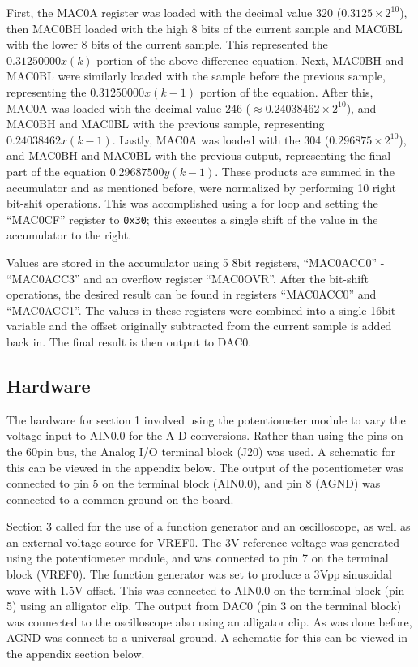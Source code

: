 \documentclass[12pt]{article}
\begin{document}
First, the MAC0A register was loaded with the decimal value 320 ($0.3125\times 2^{10}$), then MAC0BH loaded with the high 8 bits of the current sample and MAC0BL with the lower 8 bits of the current sample. This represented the $0.31250000x(k)$ portion of the above difference equation. Next, MAC0BH and MAC0BL were similarly loaded with the sample before the previous sample, representing the $0.31250000x(k-1)$ portion of the equation. After this, MAC0A was loaded with the decimal value 246 ($\approx 0.24038462\times 2^{10}$), and MAC0BH and MAC0BL with the previous sample, representing $0.24038462x(k-1)$. Lastly, MAC0A was loaded with the 304 ($0.296875\times 2^{10}$), and MAC0BH and MAC0BL with the previous output, representing the final part of the equation $0.29687500y(k-1)$. These products are summed in the accumulator and as mentioned before, were normalized by performing 10 right bit-shit operations. This was accomplished using a for loop and setting the ``MAC0CF'' register to \texttt{0x30}; this executes a single shift of the value in the accumulator to the right.

Values are stored in the accumulator using 5 8bit registers, ``MAC0ACC0'' - ``MAC0ACC3'' and an overflow register ``MAC0OVR''. After the bit-shift operations, the desired result can be found in registers ``MAC0ACC0'' and ``MAC0ACC1''. The values in these registers were combined into a single 16bit variable and the offset originally subtracted from the current sample is added back in. The final result is then output to DAC0.
\subsection{Hardware}

The hardware for section 1 involved using the potentiometer module to vary the voltage input to AIN0.0 for the A-D conversions. Rather than using the pins on the 60pin bus, the Analog I/O terminal block (J20) was used. A schematic for this can be viewed in the appendix below. The output of the potentiometer was connected to pin 5 on the terminal block (AIN0.0), and pin 8 (AGND) was connected to a common ground on the board. 

Section 3 called for the use of a function generator and an oscilloscope, as well as an external voltage source for VREF0. The \si{3}{V} reference voltage was generated using the potentiometer module, and was connected to pin 7 on the terminal block (VREF0). The function generator was set to produce a \si{3}{Vpp} sinusoidal wave with \num{1.5}\si{V} offset. This was connected to AIN0.0 on the terminal block (pin 5) using an alligator clip. The output from DAC0 (pin 3 on the terminal block) was connected to the oscilloscope also using an alligator clip. As was done before, AGND was connect to a universal ground. A schematic for this can be viewed in the appendix section below. 
\end{document}
